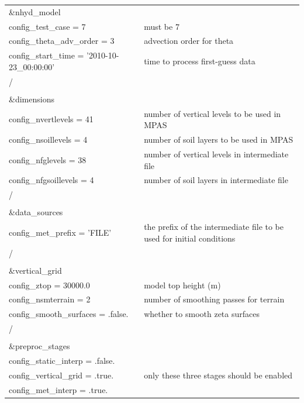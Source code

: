 \documentclass[11pt]{report}
\begin{document}
\begin{longtable}{p{3.0in} |p{3.25in}}

\&nhyd\_model\\
   config\_test\_case       = 7                      & must be 7 \\
   config\_theta\_adv\_order = 3                     & advection order for theta \\
   config\_start\_time      = '2010-10-23\_00:00:00' & time to process first-guess data \\
/\\
\\
\&dimensions\\
   config\_nvertlevels     = 41                      & number of vertical levels to be used in MPAS \\
   config\_nsoillevels     = 4                       & number of soil layers to be used in MPAS \\
   config\_nfglevels       = 38                      & number of vertical levels in intermediate file \\
   config\_nfgsoillevels   = 4                       & number of soil layers in intermediate file \\
/\\
\\
\&data\_sources\\
   config\_met\_prefix      = 'FILE'                 & the prefix of the intermediate file to be used for initial conditions \\
/\\
\\
\&vertical\_grid\\
   config\_ztop            = 30000.0                 & model top height (m) \\
   config\_nsmterrain      = 2                       & number of smoothing passes for terrain \\
   config\_smooth\_surfaces = .false.                 & whether to smooth zeta surfaces \\
/\\
\\
\&preproc\_stages                                    & \\
   config\_static\_interp   = .false.                & \\
   config\_vertical\_grid   = .true.                 & only these three stages should be enabled \\
   config\_met\_interp      = .true.                 & \\

\end{longtable}
\end{document}
